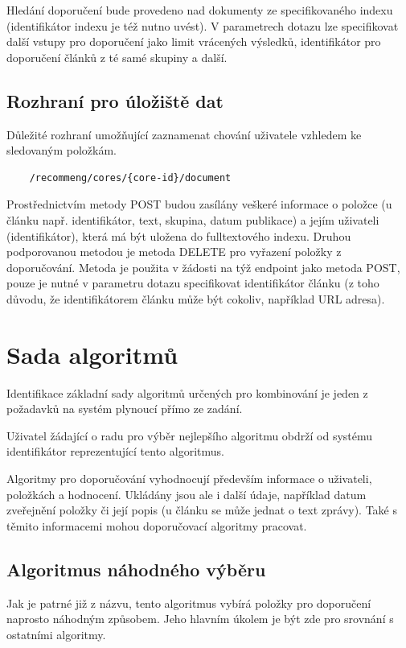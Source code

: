 \documentclass[thesis=M,czech]{FITthesis}[2014/05/07]
\begin{document}
Hledání doporučení bude provedeno nad dokumenty ze specifikovaného indexu (identifikátor indexu je též nutno uvést). V parametrech dotazu lze specifikovat další vstupy pro doporučení jako limit vrácených výsledků, identifikátor pro doporučení článků z té samé skupiny a další.

\subsection{Rozhraní pro úložiště dat}

Důležité rozhraní umožňující zaznamenat chování uživatele vzhledem ke sledovaným položkám.

\begin{verbatim}
	/recommeng/cores/{core-id}/document
\end{verbatim}

Prostřednictvím metody POST budou zasílány veškeré informace o položce (u článku např. identifikátor, text, skupina, datum publikace) a jejím uživateli (identifikátor), která má být uložena do fulltextového indexu. Druhou podporovanou metodou je metoda DELETE pro vyřazení položky z doporučování. Metoda je použita v žádosti na týž endpoint jako metoda POST, pouze je nutné v parametru dotazu specifikovat identifikátor článku (z toho důvodu, že identifikátorem článku může být cokoliv, například URL adresa).
			
\section{Sada algoritmů}

Identifikace základní sady algoritmů určených pro kombinování je jeden z požadavků na systém plynoucí přímo ze zadání. 

Uživatel žádající o radu pro výběr nejlepšího algoritmu obdrží od systému identifikátor reprezentující tento algoritmus. 

Algoritmy pro doporučování vyhodnocují především informace o uživateli, položkách a hodnocení. Ukládány jsou ale i další údaje, například datum zveřejnění položky či její popis (u článku se může jednat o text zprávy). Také s těmito informacemi mohou doporučovací algoritmy pracovat. 

\subsection{Algoritmus náhodného výběru}

Jak je patrné již z názvu, tento algoritmus vybírá položky pro doporučení naprosto náhodným způsobem. Jeho hlavním úkolem je být zde pro srovnání s ostatními algoritmy. 
\end{document}
